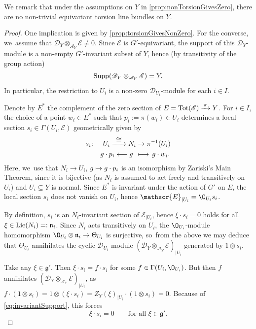 \documentclass[JEP,XML,SOM,Unicode,published]{cedram}
\newcommand\mto{\mathchoice{\longmapsto}{\mapsto}{\mapsto}{\mapsto}}
\newcommand{\To}[1]{\mathchoice{\xrightarrow{\textstyle\kern4pt#1\kern3pt}}{\xrightarrow{\,#1\,}}{}{}}
\newcommand\from{\mathchoice{\longleftarrow}{\leftarrow}{\leftarrow}{\leftarrow}}
\newcommand\mfrom{\mathrel{\from\joinrel\mapstochar}}
\newcommand{\cA}{\mathscr{A}}
\newcommand{\frg}{\mathfrak{g}}
\DeclareMathOperator{\Lie}{\textup{Lie}}
\DeclareMathOperator{\Supp}{\textup{Supp}}
\DeclareMathOperator{\Tot}{Tot}
\newcommand\restr[2]{{#1_{| {#2}}}}
\begin{document}
We remark that under the assumptions on $Y$ in \cref{prop:nonTorsionGivesZero}, there are no non-trivial equivariant torsion line bundles on $Y$.

\begin{proof}
One implication is given by \cref{prop:torsionGivesNonZero}. For the converse, we~assume that $\mathscr{D}_Y \otimes_{\cA_Y} \mathscr{E} \neq 0$. Since $\mathscr{E}$ is $G'$-equivariant, the support of this $\mathscr{D}_Y$\nobreakdash-mod\-ule is a non-empty $G'$-invariant subset of $Y$, hence (by transitivity of the group action)
\begin{equation} \label{eq:invariantSupport}
\Supp(\mathscr{D}_Y \otimes_{\cA_Y} \mathscr{E}) = Y.
\end{equation}
In particular, the restriction to $U_i$ is a non-zero $\mathscr{D}_{U_i}$\nobreakdash-mod\-ule for each $i \in I$.

Denote by $E^*$ the complement of the zero section of $E = \Tot(\mathscr E) \To{\pi} Y$. For $i \in I$, the choice of a point $w_i \in E^*$ such that $p_i := \pi(w_i) \in U_i$ determines a local section $s_i \in \Gamma(U_i, \mathscr E)$ geometrically given by
\begin{align*}
s_i \colon \quad U_i \To{\cong} N_i& \to \pi^{-1}(U_i) \\
g \cdot p_i \mfrom\, g\;\,& \mto \,g \cdot w_i.
\end{align*}
Here, we~use that $N_i \to U_i$, $g \mto g \cdot p_i$ is an isomorphism by Zariski's Main Theorem, since it is bijective (as $N_i$ is assumed to act freely and transitively on $U_i$) and $U_i \subseteq Y$ is normal. Since $E^*$ is invariant under the action of $G'$ on $E$, the local section $s_i$ does not vanish on $U_i$, hence $\restr{\mathscr{E}}{U_i} = \O_{U_i} s_i$.

By definition, $s_i$ is an $N_i$-invariant section of $\restr{\mathscr{E}}{U_i}$, hence $\xi \cdot s_i = 0$ holds for all $\xi \in \Lie(N_i) =: \mathfrak n_i$. Since $N_i$ acts transitively on $U_i$, the $\O_{U_i}$\nobreakdash-mod\-ule homomorphism $\O_{U_i} \otimes \mathfrak n_i \to \Theta_{U_i}$ is surjective, so~from the above we may deduce that $\Theta_{U_i}$ annihilates the cyclic $\mathscr{D}_{U_i}$\nobreakdash-mod\-ule $\restr{(\mathscr{D}_Y \otimes_{\cA_Y} \mathscr{E})}{U_i}$ generated by $1 \otimes s_i$.

Take any $\xi \in \frg'$. Then $\xi \cdot s_i = f \cdot s_i$ for some $f \in \Gamma(U_i,\O_{U_i})$. But then $f$ annihilates $\restr{(\mathscr{D}_Y \otimes_{\cA_Y} \mathscr{E})}{U_i}$, as $f \cdot (1 \otimes s_i) = 1 \otimes (\xi \cdot s_i) = \restr{Z_Y(\xi)}{U_i} \cdot (1 \otimes s_i) = 0$. Because of \eqref{eq:invariantSupport}, this forces
\[
\xi \cdot s_i = 0 \qquad \text{for all }\xi \in \frg'.
\]


\end{proof}
\end{document}
